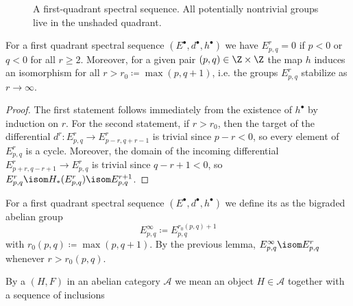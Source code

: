 \begin{figure}[ht]
	\centering
	\caption{A first-quadrant spectral sequence. All potentially nontrivial groups live in the unshaded quadrant.}
\end{figure}
\begin{lemma}
	For a first quadrant spectral sequence $(E^\bullet, d^\bullet, h^\bullet)$ we have $E^r_{p, q} = 0$ if $p < 0$ or $q < 0$ for all $r \geq 2$.
	Moreover, for a given pair $(p, q) \in \Z \times \Z$ the map $h$ induces an isomorphism for all $r > r_0 \coloneq \max(p, q + 1)$, i.e. the groups $E^r_{p, q}$ stabilize as $r \to \infty$.
\end{lemma}
\begin{proof}
	The first statement follows immediately from the existence of $h^\bullet$ by induction on $r$.
	For the second statement, if $r > r_0$, then the target of the differential $d^r\colon E^r_{p, q} \to E^r_{p - r, q + r - 1}$ is trivial since $p - r < 0$, so every element of $E^r_{p, q}$ is a cycle.
	Moreover, the domain of the incoming differential $E^r_{p + r, q - r + 1} \to E^r_{p, q}$ is trivial since $q - r + 1 < 0$, so $E^r_{p, q} \isom H_*(E^r_{p, q}) \isom E^{r + 1}_{p, q}$.
\end{proof}
\begin{definition}
	For a first quadrant spectral sequence $(E^\bullet, d^\bullet, h^\bullet)$ we define its  as the bigraded abelian group
	\begin{equation*}
		E^\infty_{p, q} \coloneq E^{r_0(p, q) + 1}_{p, q}
	\end{equation*}
	with $r_0(p, q) \coloneq \max(p, q + 1)$.
	By the previous lemma, $E^\infty_{p, q} \isom E^r_{p, q}$ whenever $r > r_0(p, q)$.
\end{definition}
By a  $(H, F)$ in an abelian category $\mathcal{A}$ we mean an object $H \in \mathcal{A}$ together with a sequence of inclusions
